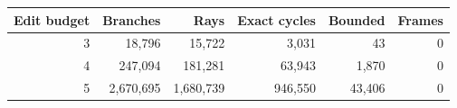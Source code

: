 \begin{center}\small
\begin{tabular}{@{}rrrrrr@{}}
\toprule
Edit budget & Branches & Rays & Exact cycles & Bounded & Frames\\\midrule
3 & 18,796 & 15,722 & 3,031 & 43 & 0\\
4 & 247,094 & 181,281 & 63,943 & 1,870 & 0\\
5 & 2,670,695 & 1,680,739 & 946,550 & 43,406 & 0\\
\bottomrule
\end{tabular}
\end{center}
